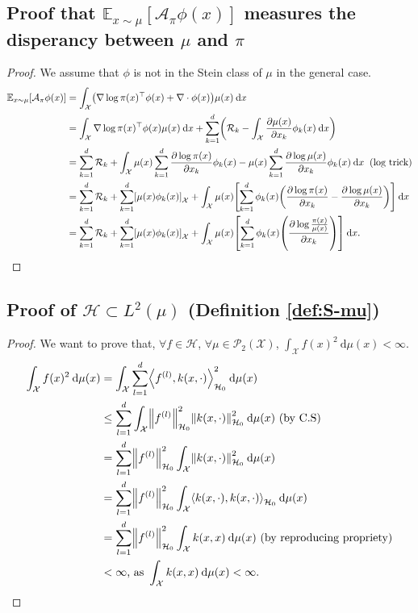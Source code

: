 \documentclass{article}
\newcommand{\E}{\mathbb{E}}
\newcommand{\X}{\mathcal{X}}
\newcommand{\A}{\mathcal{A}}
\renewcommand{\P}{\mathcal{P}}
\renewcommand{\H}{\mathcal{H}}
\newcommand{\diff}[2]{\frac{\partial #1}{\partial #2}}
\renewcommand{\d}{\: \mathrm{d}}
\DeclarePairedDelimiter{\norm}{\|}{\|}
\DeclarePairedDelimiter{\pare}{(}{)}
\DeclarePairedDelimiter{\sq}{[}{]}
\DeclarePairedDelimiter{\sca}{\langle}{\rangle}
\begin{document}
\subsection{Proof that $\E_{x \sim \mu}[\A_\pi \phi (x)]$ measures the disperancy between $\mu$ and $\pi$}
\begin{proof}\label{proof:Esp_distance}
  We assume that $\phi$ is not in the Stein class of $\mu$ in the general case.
  \begin{equation*}
  \begin{split}
    \E_{x \sim \mu}[\A_\pi \phi (x)] &=
      \int_\X \pare*{ \nabla \log \pi(x)^\top \phi(x) + \nabla \cdot \phi(x) } \mu(x) \d x \\
    &= \int_\X \nabla \log \pi(x)^\top \phi(x) \mu(x) \d x +
    \sum_{k=1}^d \pare*{ \mathcal{R}_k - \int_\X \diff{\mu(x)}{x_k} \phi_k(x) \d x} \\
    &= \sum_{k=1}^d \mathcal{R}_k +
      \int_\X  \mu(x) \sum_{k=1}^d \diff{\log \pi(x)}{x_k}\phi_k(x) -
    \mu(x) \sum_{k=1}^d \diff{\log \mu(x)}{x_k} \phi_k(x) \d x \;\; \text{(log trick)} \\
    &= \sum_{k=1}^d \mathcal{R}_k +
      \sum_{k=1}^d \sq*{\mu(x) \phi_k(x)}_\X + \int_\X  \mu(x) \sq*{ \sum_{k=1}^d \phi_k(x) \pare*{ \diff{\log \pi(x)}{x_k} - \diff{\log \mu(x)}{x_k}}} \d x \\
    &= \sum_{k=1}^d \mathcal{R}_k +
      \sum_{k=1}^d \sq*{\mu(x) \phi_k(x)}_\X + \int_\X  \mu(x) \sq*{ \sum_{k=1}^d \phi_k(x) \pare*{ \diff{\log \frac{\pi(x)}{\mu(x)}}{x_k}}} \d x.
  \end{split}
\end{equation*}
\end{proof}

\subsection{Proof of $\H \subset L^2(\mu)$ (Definition \ref{def:S-mu})}\label{pro:H-L2}
\begin{proof}
  We want to prove that, $\forall f \in \H$, 
  $\forall \mu \in \P_2(\X)$, $\int_\X f(x)^2 \d \mu(x) < \infty$.
  \begin{align*}
    \int_\X f(x)^2 \d \mu(x) &= \int_\X \sum_{l=1}^d \sca*{ f^{(l)}, k(x, \cdot) }^2_{\H_0} \d \mu(x) \\
    &\leq \sum_{l=1}^d \int_\X \norm*{f^{(l)}}^2_{\H_0} \norm*{k(x, \cdot)}^2_{\H_0} \d \mu(x)
      \text{ (by C.S)} \\
    &= \sum_{l=1}^d \norm*{f^{(l)}}^2_{\H_0} \int_\X \norm*{k(x, \cdot)}^2_{\H_0} \d \mu(x) \\
    &= \sum_{l=1}^d \norm*{f^{(l)}}^2_{\H_0} \int_\X \sca*{k(x, \cdot), k(x, \cdot)}_{\H_0} \d \mu(x) \\
    &= \sum_{l=1}^d \norm*{f^{(l)}}^2_{\H_0} \int_\X k(x, x) \d \mu(x)
      \text{ (by reproducing propriety)} \\
    &< \infty \text{, as } \int_\X k(x, x) \d \mu(x) < \infty.
  \end{align*}
\end{proof}
\end{document}
